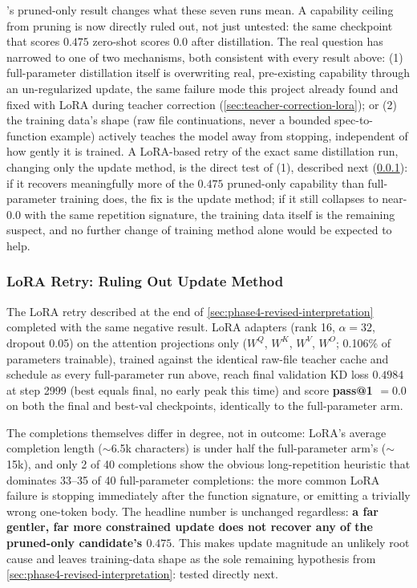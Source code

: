 \documentclass{article}
\theoremstyle{plain}
\theoremstyle{definition}
\theoremstyle{remark}
\begin{document}
's pruned-only result changes
what these seven runs mean. A capability ceiling from pruning is now
directly ruled out, not just untested: the same checkpoint that scores
$0.475$ zero-shot scores $0.0$ after distillation. The real question has
narrowed to one of two mechanisms, both consistent with every result
above: (1) full-parameter distillation itself is overwriting real,
pre-existing capability through an un-regularized update, the same
failure mode this project already found and fixed with LoRA during
teacher correction (\cref{sec:teacher-correction-lora}); or (2) the
training data's shape (raw file continuations, never a bounded
spec-to-function example) actively teaches the model away from
stopping, independent of how gently it is trained. A LoRA-based retry of
the exact same distillation run, changing only the update method, is the
direct test of (1), described next (\cref{sec:phase4-lora-kd}): if it
recovers meaningfully more of the $0.475$ pruned-only capability than
full-parameter training does, the fix is the update method; if it still
collapses to near-$0.0$ with the same repetition signature, the training
data itself is the remaining suspect, and no further change of training
method alone would be expected to help.

\subsubsection{LoRA Retry: Ruling Out Update Method}
\label{sec:phase4-lora-kd}

The LoRA retry described at the end of \cref{sec:phase4-revised-interpretation}
completed with the same negative result. LoRA adapters (rank 16,
$\alpha=32$, dropout 0.05) on the attention projections only ($W^Q$,
$W^K$, $W^V$, $W^O$; 0.106\% of parameters trainable), trained against
the identical raw-file teacher cache and schedule as every
full-parameter run above, reach final validation KD loss $0.4984$ at
step 2999 (best equals final, no early peak this time) and score
\textbf{pass@1 $=0.0$} on both the final and best-val checkpoints,
identically to the full-parameter arm.

The completions themselves differ in degree, not in outcome: LoRA's
average completion length ($\sim$6.5k characters) is under half the
full-parameter arm's ($\sim$15k), and only 2 of 40 completions show the
obvious long-repetition heuristic that dominates 33--35 of 40
full-parameter completions: the more common LoRA failure is stopping
immediately after the function signature, or emitting a trivially wrong
one-token body. The headline number is unchanged regardless:
\textbf{a far gentler, far more constrained update does not recover any
of the pruned-only candidate's $0.475$}. This makes update magnitude an
unlikely root cause and leaves training-data shape as the sole
remaining hypothesis from \cref{sec:phase4-revised-interpretation}:
tested directly next.
\end{document}
